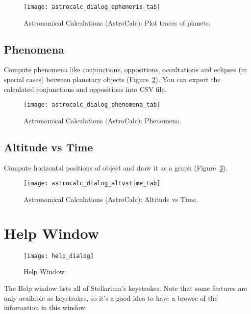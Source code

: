 \begin{figure}[htbp]
\centering\texttt{[image: astrocalc\_dialog\_ephemeris\_tab]}
\caption{Astronomical Calculations (AstroCalc): Plot traces of planets.}
\label{fig:gui:AstroCalc:Ephemeris}
\end{figure}

\subsection{Phenomena}
\label{sec:gui:AstroCalc:Phenomena}

Compute phenomena like conjunctions, oppositions, occultations and eclipses (in special cases) between planetary objects (Figure~\ref{fig:gui:AstroCalc:Phenomena}). You can export the calculated conjunctions and oppositions into CSV file.

\begin{figure}[htbp]
\centering\texttt{[image: astrocalc\_dialog\_phenomena\_tab]}
\caption{Astronomical Calculations (AstroCalc): Phenomena.}
\label{fig:gui:AstroCalc:Phenomena}
\end{figure}

\newpage
\subsection{Altitude vs Time}
\label{sec:gui:AstroCalc:AltVsTime}
  
 Compute horizontal positions of object and draw it as a graph (Figure~\ref{fig:gui:AstroCalc:AltVsTime}).
    
\begin{figure}[htbp]
\centering\texttt{[image: astrocalc\_dialog\_altvstime\_tab]}
\caption{Astronomical Calculations (AstroCalc): Altitude vs Time.}
\label{fig:gui:AstroCalc:AltVsTime}
\end{figure}

\section{Help Window}
\label{sec:gui:help}

\begin{figure}[htbp]
\centering\texttt{[image: help\_dialog]}
\caption{Help Window}
\label{fig:gui:help}
\end{figure}

\noindent The Help window lists all of Stellarium's keystrokes. Note that some
features are only available as keystrokes, so it's a good idea to have
a browse of the information in this window.

